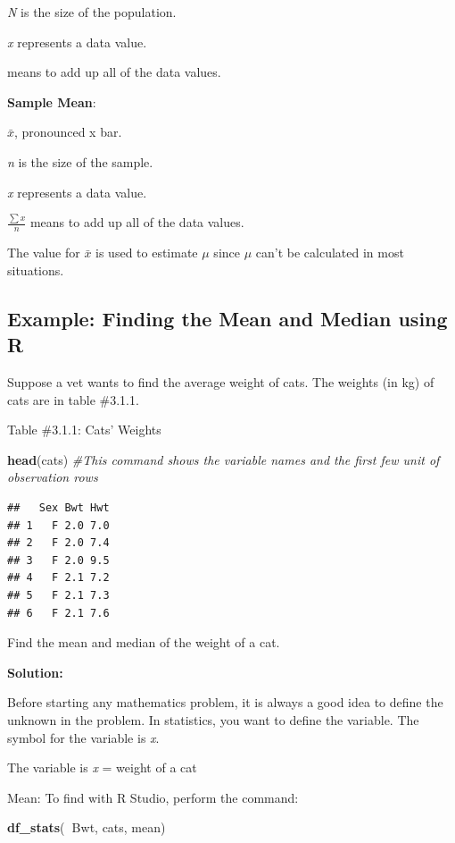 \documentclass[]{book}
\newenvironment{Shaded}{\begin{snugshade}}{\end{snugshade}}
\newcommand{\CommentTok}[1]{\textcolor[rgb]{0.56,0.35,0.01}{\textit{#1}}}
\newcommand{\KeywordTok}[1]{\textcolor[rgb]{0.13,0.29,0.53}{\textbf{#1}}}
\newcommand{\NormalTok}[1]{#1}
\newcommand{\OperatorTok}[1]{\textcolor[rgb]{0.81,0.36,0.00}{\textbf{#1}}}
\begin{document}
\emph{N} is the size of the population.

\emph{x} represents a data value.

means to add up all of the data values.

\textbf{Sample Mean}:

\(\bar{x}\), pronounced x bar.

\emph{n} is the size of the sample.

\emph{x} represents a data value.

\(\frac{\sum{x} }{n}\) means to add up all of the data values.

The value for \(\bar{x}\) is used to estimate \(\mu\) since \(\mu\) can't be calculated in most
situations.

\hypertarget{example-finding-the-mean-and-median-using-r}{%
\subsection{Example: Finding the Mean and Median using R}\label{example-finding-the-mean-and-median-using-r}}

Suppose a vet wants to find the average weight of cats. The weights (in kg) of cats are in table \#3.1.1.

Table \#3.1.1: Cats' Weights

\begin{Shaded}
\begin{Highlighting}[]
\KeywordTok{head}\NormalTok{(cats) }\CommentTok{#This command shows the variable names and the first few unit of observation rows}
\end{Highlighting}
\end{Shaded}

\begin{verbatim}
##   Sex Bwt Hwt
## 1   F 2.0 7.0
## 2   F 2.0 7.4
## 3   F 2.0 9.5
## 4   F 2.1 7.2
## 5   F 2.1 7.3
## 6   F 2.1 7.6
\end{verbatim}

Find the mean and median of the weight of a cat.

\textbf{Solution:}

Before starting any mathematics problem, it is always a good idea to define the unknown in the problem. In statistics, you want to define the variable. The symbol for the variable is \emph{x}.

The variable is \emph{x} = weight of a cat

Mean:
To find with R Studio, perform the command:

\begin{Shaded}
\begin{Highlighting}[]
\KeywordTok{df_stats}\NormalTok{(}\OperatorTok{~}\NormalTok{Bwt, cats, mean)}
\end{Highlighting}
\end{Shaded}
\end{document}
